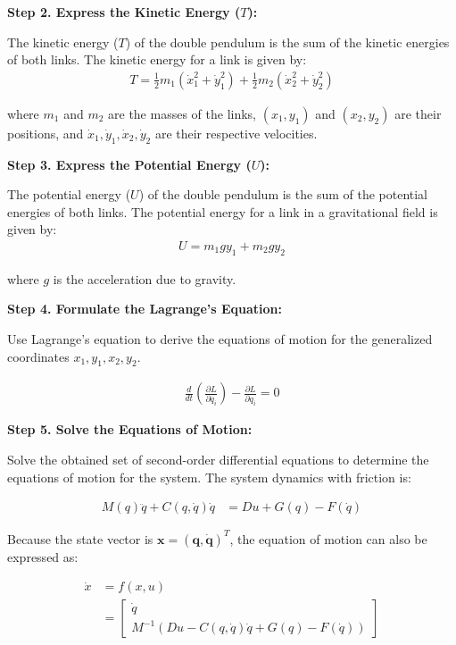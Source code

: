 \textbf{Step 2. Express the Kinetic Energy (\(T\)):}

   The kinetic energy (\(T\)) of the double pendulum is the sum of the kinetic energies of both links. The kinetic energy for a link is given by:
   \begin{align}
        T = \frac{1}{2} m_1 (\dot{x}_1^2 + \dot{y}_1^2) + \frac{1}{2} m_2 (\dot{x}_2^2 + \dot{y}_2^2)
   \end{align}

   where \(m_1\) and \(m_2\) are the masses of the links, \((x_1, y_1)\) and \((x_2, y_2)\) are their positions, and \(\dot{x}_1, \dot{y}_1, \dot{x}_2, \dot{y}_2\) are their respective velocities.

\textbf{Step 3. Express the Potential Energy (\(U\)):}

   The potential energy (\(U\)) of the double pendulum is the sum of the potential energies of both links. The potential energy for a link in a gravitational field is given by:
   \begin{align}
         U = m_1 g y_1 + m_2 g y_2
   \end{align}

   where \(g\) is the acceleration due to gravity.
   
   
\textbf{Step 4. Formulate the Lagrange's Equation:}

   Use Lagrange's equation to derive the equations of motion for the generalized coordinates \(x_1, y_1, x_2, y_2\).

    \begin{align}
    \frac{d}{dt} \left(\frac{\partial L}{\partial \dot{q_i}}\right) - \frac{\partial L}{\partial q_i} = 0
    \end{align}

\textbf{Step 5. Solve the Equations of Motion:}

   Solve the obtained set of second-order differential equations to determine the equations of motion for the system. The system dynamics with friction is:
   
   \begin{align}
        M(q)\ddot{q} + C(q,\dot{q})\dot{q} &= Du + G(q) - F(\dot{q})
   \end{align}
    
    Because the state vector is \(\mathbf{x}=(\mathbf{q},\mathbf{\dot{q}})^T\), the equation of motion can also be expressed as:
    
    \begin{equation}
    \begin{split}
        \dot{x} &= f(x,u) \\
        &= \begin{bmatrix} 
            \dot{q} \\ 
            M^{-1}(Du - C(q,\dot{q})\dot{q} + G(q) - F(\dot{q})) 
       \end{bmatrix}
    \end{split}
    \end{equation}

